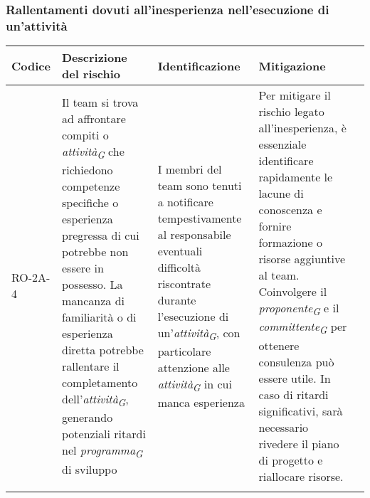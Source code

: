 \subsubsection{Rallentamenti dovuti all'inesperienza nell'esecuzione di un'attività} \label{sec:inexpAttività}
\begin{table}[H]
    \centering
    \begin{tabularx}{\textwidth}{l>{\RaggedRight}X>{\RaggedRight}X>{\RaggedRight}X>{\RaggedRight}X}
    \toprule
    \rowcolor{gray!50}
    \textbf{Codice} & \textbf{Descrizione del rischio} & \textbf{Identificazione} & \textbf{Mitigazione} \\
    \midrule
    \addlinespace 
    RO-2A-4 & 
    Il team si trova ad affrontare compiti o \textit{attività}\textsubscript{\textit{G}} che richiedono competenze specifiche o esperienza pregressa di cui potrebbe non essere in possesso. La mancanza di familiarità o di esperienza diretta potrebbe rallentare il completamento dell'\textit{attività}\textsubscript{\textit{G}}, generando potenziali ritardi nel \textit{programma}\textsubscript{\textit{G}} di sviluppo &
    I membri del team sono tenuti a notificare tempestivamente al responsabile eventuali difficoltà riscontrate durante l'esecuzione di un'\textit{attività}\textsubscript{\textit{G}}, con particolare attenzione alle \textit{attività}\textsubscript{\textit{G}} in cui manca esperienza &
    Per mitigare il rischio legato all'inesperienza, è essenziale identificare rapidamente le lacune di conoscenza e fornire formazione o risorse aggiuntive al team. Coinvolgere il \textit{proponente}\textsubscript{\textit{G}} e il \textit{committente}\textsubscript{\textit{G}} per ottenere consulenza può essere utile. In caso di ritardi significativi, sarà necessario rivedere il piano di progetto e riallocare risorse.\\
    \bottomrule
    \addlinespace 
    \end{tabularx}
\end{table}

